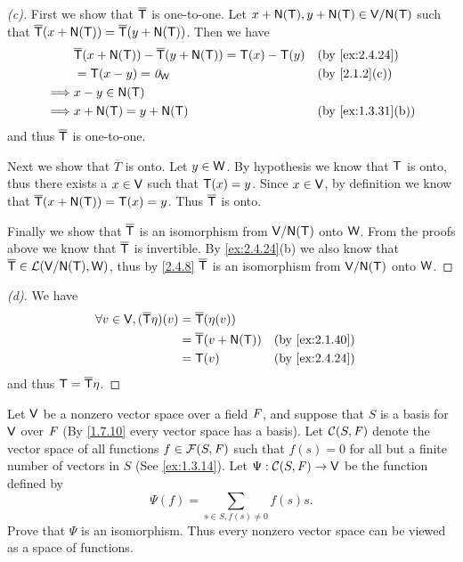 \begin{proof}[(c)]
	First we show that \(\overline{\mathsf{T}}\) is one-to-one.
	Let \(x + \ns{\T}, y + \ns{\T} \in \V / \ns{\T}\) such that \(\overline{\T}(x + \ns{\T}) = \overline{\T}(y + \ns{\T})\).
	Then we have
	\begin{align*}
		         & \overline{\T}(x + \ns{\T}) - \overline{\T}(y + \ns{\T}) = \T(x) - \T(y) &  & \by{ex:2.4.24}    \\
		         & = \T(x - y) = \zv_{\W}                                                  &  & \by{2.1.2}[c]     \\
		\implies & x - y \in \ns{\T}                                                                              \\
		\implies & x + \ns{\T} = y + \ns{\T}                                               &  & \by{ex:1.3.31}[b]
	\end{align*}
	and thus \(\overline{\mathsf{T}}\) is one-to-one.

	Next we show that \(\overline{T}\) is onto.
	Let \(y \in \mathsf{W}\).
	By hypothesis we know that \(\mathsf{T}\) is onto, thus there exists a \(x \in \mathsf{V}\) such that \(\mathsf{T}(x) = y\).
	Since \(x \in \mathsf{V}\), by definition we know that \(\overline{\T}(x + \ns{\T}) = \T(x) = y\).
	Thus \(\overline{\mathsf{T}}\) is onto.

	Finally we show that \(\overline{\mathsf{T}}\) is an isomorphism from \(\V / \ns{\T}\) onto \(\mathsf{W}\).
	From the proofs above we know that \(\overline{\mathsf{T}}\) is invertible.
	By \cref{ex:2.4.24}(b) we also know that \(\overline{\T} \in \ls(\V / \ns{\T}, \W)\), thus by \cref{2.4.8} \(\overline{\mathsf{T}}\) is an isomorphism from \(\V / \ns{\T}\) onto \(\mathsf{W}\).
\end{proof}

\begin{proof}[(d)]
	We have
	\begin{align*}
		\forall v \in \V, (\overline{\T} \eta)(v) & = \overline{\T}(\eta(v))                         \\
		                                          & = \overline{\T}(v + \ns{\T}) &  & \by{ex:2.1.40} \\
		                                          & = \T(v)                      &  & \by{ex:2.4.24}
	\end{align*}
	and thus \(\mathsf{T} = \overline{\mathsf{T}} \eta\).
\end{proof}

\begin{ex}\label{ex:2.4.25}
	Let \(\mathsf{V}\) be a nonzero vector space over a field \(\mathit{F}\), and suppose that \(S\) is a basis for \(\mathsf{V}\) over \(\mathit{F}\)
	(By \cref{1.7.10} every vector space has a basis).
	Let \(\mathcal{C}(S, \mathit{F})\) denote the vector space of all functions \(f \in \mathcal{F}(S, \mathit{F})\) such that \(f(s) = 0\) for all but a finite number of vectors in \(S\)
	(See \cref{ex:1.3.14}).
	Let \(\Psi : \mathcal{C}(S, \mathit{F}) \to \mathsf{V}\) be the function defined by
	\[
		\Psi(f) = \sum_{s \in S, f(s) \neq 0} f(s) s.
	\]
	Prove that \(\Psi\) is an isomorphism.
	Thus every nonzero vector space can be viewed as a space of functions.
\end{ex}

